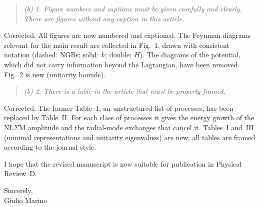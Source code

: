 \documentclass[11pt,a4paper]{article}
\newcommand{\referee}[1]{\begin{quote}\itshape\color{black!70}#1\end{quote}}
\begin{document}
\referee{(b) 1. Figure numbers and captions must be given carefully and clearly. There are figures without any caption in this article.}

Corrected. All figures are now numbered and captioned. The Feynman diagrams relevant for the main result are collected in Fig.~1, drawn with consistent notation (dashed: NGBs; solid: $h$; double: $H$). The diagrams of the potential, which did not carry information beyond the Lagrangian, have been removed. Fig.~2 is new (unitarity bounds).

\referee{(b) 2. There is a table in the article that must be properly framed.}

Corrected. The former Table~1, an unstructured list of processes, has been replaced by Table~II. For each class of processes it gives the energy growth of the NL$\Sigma$M amplitude and the radial-mode exchanges that cancel it. Tables~I and~III (minimal representations and unitarity eigenvalues) are new; all tables are framed according to the journal style.

\bigskip
I hope that the revised manuscript is now suitable for publication in Physical Review~D.

\medskip
Sincerely,\\
Giulio Marino
\end{document}

